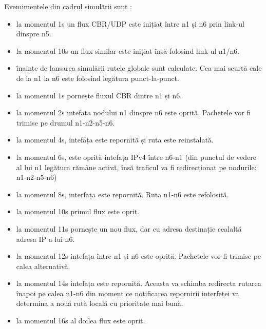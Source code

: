 \documentclass[12pt, a4paper, oneside, romanian]{teza-upb}
\begin{document}
Evemimentele din cadrul simulării sunt :
\begin{itemize}
 \item la momentul 1s un flux CBR/UDP este inițiat între n1 și n6 prin link-ul dinspre n5.
 \item la momentul 10s un flux similar este inițiat însă folosind link-ul n1/n6.
 \item înainte de lansarea simulării rutele globale sunt calculate. Cea mai scurtă cale de la n1 la n6 este folosind legătura punct-la-punct.
 \item la momentul 1s pornește fluxul CBR dintre n1 și n6.
 \item la momentul 2s intefața nodului n1 dinspre n6 este oprită. Pachetele vor fi trimise pe drumul n1-n2-n5-n6.
 \item la momentul 4s, intefața este repornită și ruta este reinstalată.
 \item la momentul 6s, este oprită intefața IPv4 între n6-n1 (din punctul de vedere al lui n1 legătura rămâne activă, însă traficul va fi redirecționat pe nodurile: n1-n2-n5-n6)
 \item la momentul 8s, interfața este repornită. Ruta n1-n6 este refolosită.
 \item la momentul 10s primul flux este oprit.
 \item la momentul 11s pornește un nou flux, dar cu adresa destinație cealaltă adresa IP a lui n6.
 \item la momentul 12s intefața între n1 și n6 este oprită. Pachetele vor fi trimise pe calea alternativă.
 \item la momentul 14s intefața este repornită. Aceasta va schimba redirecta rutarea înapoi pe calea n1-n6 din moment ce notificarea repornirii interfeței va determina a nouă rută locală cu prioritate mai bună.
 \item la momentul 16s al doilea flux este oprit.
\end{itemize}
\end{document}
